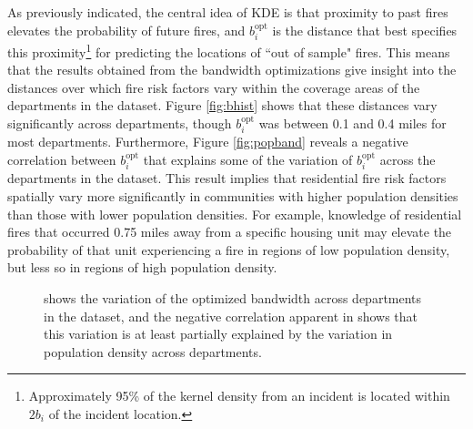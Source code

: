 \documentclass{svjour3}
\begin{document}
 As previously indicated, the central idea of KDE is that proximity to past fires elevates the probability of future fires, and $b_{i}^{\text{opt}}$ is the distance that best specifies this proximity\footnote{Approximately 95\% of the kernel density from an incident is located within $2b_i$ of the incident location.} for predicting the locations of ``out of sample" fires. This means that the results obtained from the bandwidth optimizations give insight into the distances over which fire risk factors vary within the coverage areas of the departments in the dataset. Figure \ref{fig:bhist} shows that these distances vary significantly across departments, though $b_{i}^{\text{opt}}$ was between 0.1 and 0.4 miles for most departments. Furthermore, Figure \ref{fig:popband} reveals a negative correlation between $b_{i}^{\text{opt}}$ that explains some of the variation of $b_{i}^{\text{opt}}$ across the departments in the dataset. This result implies that residential fire risk factors spatially vary more significantly in communities with higher population densities than those with lower population densities. For example, knowledge of residential fires that occurred 0.75 miles away from a specific housing unit may elevate the probability of that unit experiencing a fire in regions of low population density, but less so in regions of high population density.

\begin{figure}[!ht]
       \begin{center}
      \end{center}
      \caption{\protect{} shows the variation of the optimized bandwidth across departments in the dataset, and the negative correlation apparent in \protect{} shows that this variation is at least partially explained by the variation in population density across departments.}
     \label{fig:band_optimization}
  \end{figure}
  
\end{document}
